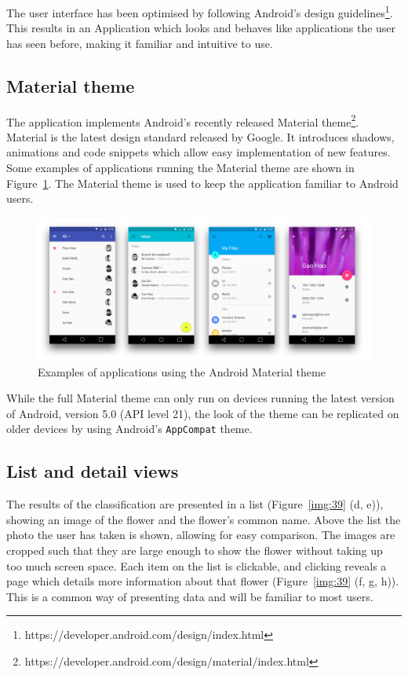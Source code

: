 \documentclass[11pt, a4paper]{report}
\begin{document}
The user interface has been optimised by following Android's design guidelines\footnote{https://developer.android.com/design/index.html}. This results in an Application which looks and behaves like applications the user has seen before, making it familiar and intuitive to use. 

\subsection{Material theme}

The application implements Android's recently released Material theme\footnote{https://developer.android.com/design/material/index.html}. Material is the latest design standard released by Google. It introduces shadows, animations and code snippets which allow easy implementation of new features. Some examples of applications running the Material theme are shown in Figure~\ref{img:38}. The Material theme is used to keep the application familiar to Android users. 

\begin{figure}[hbt]
	\centering
  \includegraphics[totalheight=7cm]{img/38.png}
  \caption{Examples of applications using the Android Material theme}
  \label{img:38}
\end{figure}

 While the full Material theme can only run on devices running the latest version of Android, version 5.0 (API level 21), the look of the theme can be replicated on older devices by using Android's \verb|AppCompat| theme. 


\subsection{List and detail views}

The results of the classification are presented in a list (Figure~\ref{img:39} (d, e)), showing an image of the flower and the flower's common name. Above the list the photo the user has taken is shown, allowing for easy comparison. The images are cropped such that they are large enough to show the flower without taking up too much screen space. Each item on the list is clickable, and clicking reveals a page which details more information about that flower (Figure~\ref{img:39} (f, g, h)). This is a common way of presenting data and will be familiar to most users.
\end{document}

